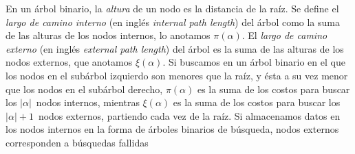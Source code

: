   En un árbol binario,
  la \emph{altura} de un nodo es la distancia de la raíz.%
  Se define el \emph{largo de camino interno}%
  (en inglés \emph{\foreignlanguage{english}{internal path length}})
  del árbol
  como la suma de las alturas de los nodos internos,
  lo anotamos \(\pi(\alpha)\).
  El \emph{largo de camino externo}%
  (en inglés \emph{\foreignlanguage{english}{external path length}})
  del árbol
  es la suma de las alturas de los nodos externos,
  que anotamos \(\xi(\alpha)\).
  Si buscamos en un árbol binario
  en el que los nodos en el subárbol izquierdo son menores que la raíz,
  y ésta a su vez menor que los nodos en el subárbol derecho,
  \(\pi(\alpha)\) es la suma de los costos
  para buscar los \(\lvert \alpha \rvert\)~nodos internos,
  mientras \(\xi(\alpha)\) es la suma de los costos
  para buscar los \(\lvert \alpha \rvert + 1\)~nodos externos,
  partiendo cada vez de la raíz.
  Si almacenamos datos en los nodos internos
  en la forma de árboles binarios de búsqueda,
  nodos externos corresponden a búsquedas fallidas

